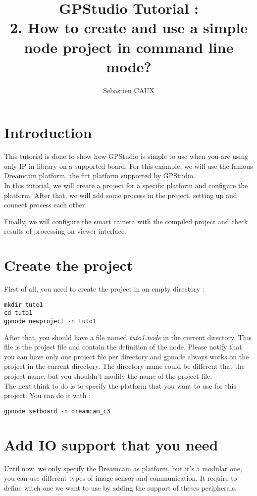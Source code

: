 \documentclass[10pt,a4paper]{article}
\author{Sebastien CAUX}
\title{GPStudio Tutorial : \\ 2. How to create and use a simple node project in command line mode?}
\begin{document}
\maketitle
\section{Introduction}
This tutorial is done to show how GPStudio is simple to use when you are using only IP in library on a supported board. For this example, we will use the famous Dreamcam platform, the firt platform supported by GPStudio.\\

In this tutorial, we will create a project for a specific platform and configure the platform. After that, we will add some process in the project, setting up and connect process each other.

Finally, we will configure the smart camera with the compiled project and check results of processing on viewer interface.

\section{Create the project}
First of all, you need to create the project in an empty directory :
\begin{Verbatim}[frame=single]
mkdir tuto1
cd tuto1
gpnode newproject -n tuto1
\end{Verbatim}

After that, you should have a file named \emph{tuto1.node} in the current directory. This file is the project file and contain the definition of the node. Please notify that you can have only one project file per directory and gpnode always works on the project in the current directory. The directory name could be different that the project name, but you shouldn't modify the name of the project file.\\

The next think to do is to specify the platform that you want to use for this project. You can do it with :
\begin{Verbatim}[frame=single]
gpnode setboard -n dreamcam_c3
\end{Verbatim}

\section{Add IO support that you need}
Until now, we only specify the Dreamcam as platform, but it's a modular one, you can use different types of image sensor and communication. It require to define witch one we want to use by adding the support of theses peripherals. \\
\end{document}
